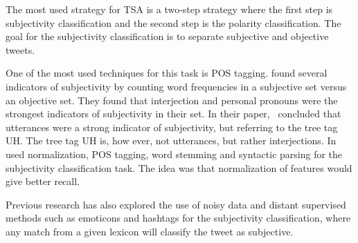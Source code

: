 The most used strategy for TSA is a two-step strategy where the first step is subjectivity classification and the second step is the polarity classification. The goal for the subjectivity classification is to separate subjective and objective tweets.

One of the most used techniques for this task is POS tagging. \cite{article:pak} found several indicators of subjectivity by counting word frequencies in a subjective set versus an objective set. They found that interjection and personal pronouns were the strongest indicators of subjectivity in their set. In their paper,~\cite{article:pak} concluded that utterances were a strong indicator of subjectivity, but referring to the tree tag UH. The tree tag UH is, how ever, not utterances, but rather interjections. In~\cite{article:jiang} used normalization, POS tagging, word stemming and syntactic parsing for the subjectivity classification task. The idea was that normalization of features would give better recall.

Previous research has also explored the use of noisy data and distant supervised methods such as emoticons and hashtags for the subjectivity classification, where any match from a given lexicon will classify the tweet as subjective.